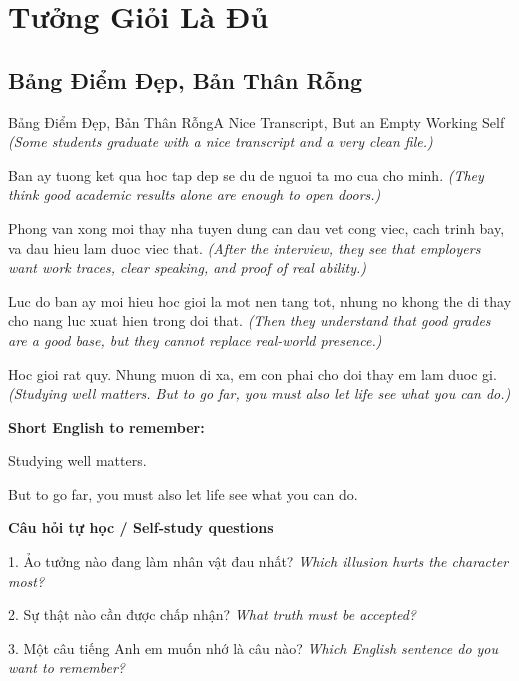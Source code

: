 \chapter{Tưởng Giỏi Là Đủ}

\section{Bảng Điểm Đẹp, Bản Thân Rỗng}
\begin{truyen}{Bảng Điểm Đẹp, Bản Thân Rỗng}{A Nice Transcript, But an Empty Working Self}
\textit{(Some students graduate with a nice transcript and a very clean file.)}

Ban ay tuong ket qua hoc tap dep se du de nguoi ta mo cua cho minh.
\textit{(They think good academic results alone are enough to open doors.)}

Phong van xong moi thay nha tuyen dung can dau vet cong viec, cach trinh bay, va dau hieu lam duoc viec that.
\textit{(After the interview, they see that employers want work traces, clear speaking, and proof of real ability.)}

Luc do ban ay moi hieu hoc gioi la mot nen tang tot, nhung no khong the di thay cho nang luc xuat hien trong doi that.
\textit{(Then they understand that good grades are a good base, but they cannot replace real-world presence.)}

\end{truyen}

\begin{baihoc}
Hoc gioi rat quy. Nhung muon di xa, em con phai cho doi thay em lam duoc gi.
\textit{(Studying well matters. But to go far, you must also let life see what you can do.)}
\end{baihoc}

\begin{ghinhoanh}
\textbf{Short English to remember:}

Studying well matters.

But to go far, you must also let life see what you can do.

\end{ghinhoanh}

\begin{tuhocnhanh}
\textbf{Câu hỏi tự học / Self-study questions}

1. Ảo tưởng nào đang làm nhân vật đau nhất? \textit{Which illusion hurts the character most?}

2. Sự thật nào cần được chấp nhận? \textit{What truth must be accepted?}

3. Một câu tiếng Anh em muốn nhớ là câu nào? \textit{Which English sentence do you want to remember?}
\end{tuhocnhanh}
\ngancach

